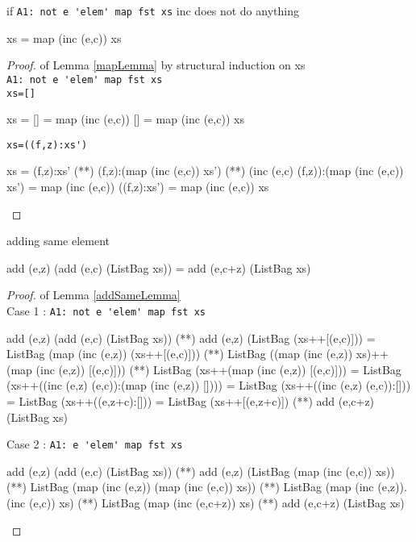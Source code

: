 \begin{lemma}\label{mapLemma}if \verb|A1: not e 'elem' map fst xs| inc does not do anything
\begin{code}
xs = map (inc (e,c)) xs
\end{code}
\end{lemma}
\begin{proof} of Lemma \ref{mapLemma} by structural induction on xs\\
\verb|A1: not e 'elem' map fst xs|\\
\verb|xs=[]|
\begin{code}
xs = []
   = map (inc (e,c)) []
   = map (inc (e,c)) xs
\end{code}
\verb|xs=((f,z):xs')|
\begin{code}
xs = (f,z):xs'
   (**) (f,z):(map (inc (e,c)) xs')
   (**) (inc (e,c) (f,z)):(map (inc (e,c)) xs')
   = map (inc (e,c)) ((f,z):xs')
   = map (inc (e,c)) xs
\end{code}
\end{proof}
\begin{lemma}\label{addSameLemma} adding same element
\begin{code}
add (e,z) (add (e,c) (ListBag xs)) = add (e,c+z) (ListBag xs)
\end{code}
\end{lemma}
\begin{proof} of Lemma \ref{addSameLemma}\\
Case 1 : \verb|A1: not e 'elem' map fst xs|
\begin{code}
add (e,z) (add (e,c) (ListBag xs)) 
             (**) add (e,z) (ListBag (xs++[(e,c)]))
             = ListBag (map (inc (e,z)) (xs++[(e,c)]))
             (**) ListBag ((map (inc (e,z)) xs)++(map (inc (e,z)) [(e,c)]))
             (**) ListBag (xs++(map (inc (e,z)) [(e,c)]))
             = ListBag (xs++((inc (e,z) (e,c)):(map (inc (e,z)) [])))
             = ListBag (xs++((inc (e,z) (e,c)):[]))
             = ListBag (xs++((e,z+c):[]))
             = ListBag (xs++[(e,z+c)])
             (**) add (e,c+z) (ListBag xs)
\end{code}
Case 2 : \verb|A1: e 'elem' map fst xs|
\begin{code}
add (e,z) (add (e,c) (ListBag xs)) 
             (**) add (e,z) (ListBag (map (inc (e,c)) xs))
             (**) ListBag (map (inc (e,z)) (map (inc (e,c)) xs))
             (**) ListBag (map (inc (e,z)).(inc (e,c)) xs)
             (*\sEq{\ref{sameIncLemma}}*) ListBag (map (inc (e,c+z)) xs)
             (**) add (e,c+z) (ListBag xs)
\end{code}
\end{proof}
